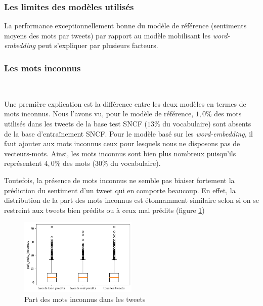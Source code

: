 \documentclass[11pt,french,french]{article}
\begin{document}
\subsubsection{Les limites des modèles
utilisés}\label{les-limites-des-moduxe8les-utilisuxe9s}

La performance exceptionnellement bonne du modèle de référence
(sentiments moyens des mots par tweets) par rapport au modèle mobilisant
les \emph{word-embedding} peut s'expliquer par plusieurs facteurs.

\subsubsection{Les mots inconnus}\label{les-mots-inconnus}

~

Une première explication est la différence entre les deux modèles en
termes de mots inconnus. Nous l'avons vu, pour le modèle de référence,
\(1,0 \%\) des mots utilisés dans les tweets de la base test SNCF
(\(13 \%\) du vocabulaire) sont absents de la base d'entraînement SNCF.
Pour le modèle basé sur les \emph{word-embedding}, il faut ajouter aux
mots inconnus ceux pour lesquels nous ne disposons pas de vecteurs-mots.
Ainsi, les mots inconnus sont bien plus nombreux puisqu'ils représentent
\(4,0 \%\) des mots (\(30 \%\) du vocabulaire).

Toutefois, la présence de mots inconnus ne semble pas biaiser fortement
la prédiction du sentiment d'un tweet qui en comporte beaucoup. En
effet, la distribution de la part des mots inconnus est étonnamment
similaire selon si on se restreint aux tweets bien prédits ou à ceux mal
prédits (figure \ref{fig:mots_inconnus})

\begin{figure}[ht]
\begin{center}
\includegraphics[width=0.5\textwidth]{img/mots_inconnus.png}
\captionsetup{margin=0cm,format=hang,justification=justified}
\caption{Part des mots inconnus dans les tweets}\label{fig:mots_inconnus}
\end{center}
\end{figure}
\end{document}
